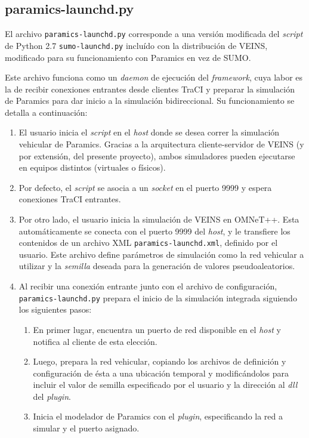 \subsection{paramics-launchd.py}

El archivo \texttt{paramics-launchd.py} corresponde a una versión modificada del \emph{script} de Python 2.7 \texttt{sumo-launchd.py} incluído con la distribución de VEINS, modificado para su funcionamiento con Paramics en vez de SUMO.

Este archivo funciona como un \emph{daemon} de ejecución del \emph{framework}, cuya labor es la de recibir conexiones entrantes desde clientes TraCI y preparar la simulación de Paramics para dar inicio a la simulación bidireccional. Su funcionamiento se detalla a continuación:

\begin{enumerate}
    \item El usuario inicia el \emph{script} en el \emph{host} donde se desea correr la simulación vehicular de Paramics. Gracias a la arquitectura cliente-servidor de VEINS (y por extensión, del presente proyecto), ambos simuladores pueden ejecutarse en equipos distintos (virtuales o físicos).
    
    \item Por defecto, el \emph{script} se asocia a un \emph{socket} en el puerto 9999 y espera conexiones TraCI entrantes.
    
    \item Por otro lado, el usuario inicia la simulación de VEINS en OMNeT++. Esta automáticamente se conecta con el puerto 9999 del \emph{host}, y le transfiere los contenidos de un archivo XML \texttt{paramics-launchd.xml}, definido por el usuario. Este archivo define parámetros de simulación como la red vehicular a utilizar y la \emph{semilla} deseada para la generación de valores pseudoaleatorios.
    

    
    \item Al recibir una conexión entrante junto con el archivo de configuración, \texttt{paramics-launchd.py} prepara el inicio de la simulación integrada siguiendo los siguientes pasos:
    
    \begin{enumerate}
        \item En primer lugar, encuentra un puerto de red disponible en el \emph{host} y notifica al cliente de esta elección.
        \item Luego, prepara la red vehicular, copiando los archivos de definición y configuración de ésta a una ubicación temporal y modificándolos para incluir el valor de semilla especificado por el usuario y la dirección al \emph{dll} del \emph{plugin}.
        \item Inicia el modelador de Paramics con el \emph{plugin}, especificando la red a simular y el puerto asignado.
    \end{enumerate}


\end{enumerate}

